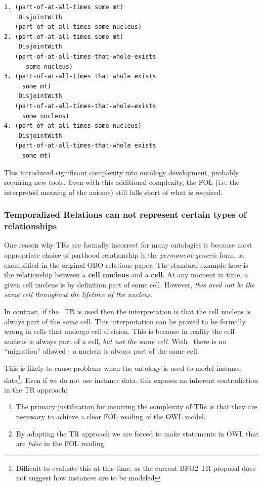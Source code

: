 \documentclass{bioinfo}
\def\partOfAtAllTimes{\pr{part-of-at-all-times}}
\begin{document}
\begin{verbatim}
1. (part-of-at-all-times some mt)
    DisjointWith
   (part-of-at-all-times some nucleus)
2. (part-of-at-all-times some mt)
    DisjointWith
   (part-of-at-all-times-that-whole-exists
      some nucleus)
3. (part-of-at-all-times that whole exists
     some mt)
    DisjointWith 
   (part-of-at-all-times-that-whole-exists
     some nucleus)
4. (part-of-at-all-times some nucleus)
    DisjointWith
   (part-of-at-all-times-that-whole exists
     some mt)
\end{verbatim}

This introduced significant complexity into ontology development,
probably requiring new tools. Even with this additional complexity,
the FOL (i.e. the interpreted meaning of the axioms) still falls short
of what is required.

\subsubsection{Temporalized Relations can not represent certain types
  of relationships}

One reason why TRs are formally incorrect for many ontologies is
because most appropriate choice of parthood relationship is the
\emph{permanent-generic} form, as exemplified in the original OBO
relations paper. The standard example here is the relationship between
a \textbf{cell nucleus} and a \textbf{cell}. At any moment in time, a
given cell nucleus is by definition part of some cell. However,
\emph{this need not be the same cell throughout the lifetime of the
  nucleus}.

In contrast, if the \partOfAtAllTimes\ TR is used then the
interpretation is that the cell nucleus is always part of the
\emph{same} cell. This interpretation can be proved to be formally
wrong in cells that undergo cell division\cite{CellDiv}. This is
because in reality the cell nucleus is always part of a cell,
\emph{but not the same cell}. With \partOfAtAllTimes\, there is no
``migration'' allowed - a nucleus is always part of the same cell.

This is likely to cause problems when the ontology is used to model
instance data\footnote{Difficult to evaluate this at this time, as the
  current BFO2 TR proposal does not suggest how instances are to be
  modeled}. Even if we do not use instance data, this exposes an
inherent contradiction in the TR approach:

\begin{enumerate}

\item The primary justification for incurring the complexity of TRs is
  that they are necessary to achieve a clear FOL reading of the OWL
  model.

\item By adopting the TR approach we are forced to make statements
  in OWL that are \emph{false} in the FOL reading.

\end{enumerate}
\end{document}
